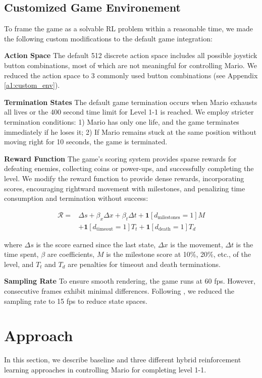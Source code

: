 \documentclass{article}
\begin{document}
\subsection{Customized Game Environement}

To frame the game as a solvable RL problem within a reasonable time, we made 
the following custom modifications to the default game integration:

\textbf{Action Space} 
The default 512 discrete action space includes all possible joystick button 
combinations, most of which are not meaningful for controlling Mario. We 
reduced the action space to 3 commonly used button combinations (see 
Appendix \ref{a1:custom_env}).

\textbf{Termination States}
The default game termination occurs when Mario exhausts all lives or the 400 
second time limit for Level 1-1 is reached. We employ stricter termination 
conditions: 1) Mario has only one life, and the game terminates immediately if 
he loses it; 2) If Mario remains stuck at the same position without moving 
right for 10 seconds, the game is terminated.

\textbf{Reward Function}
\label{sec:reward}
The game's scoring system provides sparse rewards for defeating enemies, 
collecting coins or power-ups, and successfully completing the level.
We modify the reward function to provide dense rewards, incorporating scores, 
encouraging rightward movement with milestones, and penalizing time consumption 
and termination without success:

\begin{align*}
      \mathcal{R} = &\Delta s + \beta_x \Delta x + \beta_t \Delta t + \mathbf{1}[d_{\text{milestones}} = 1] M\\
      & + \mathbf{1}[d_{\text{timeout}} = 1] T_t + \mathbf{1}[d_{\text{death}} = 1] T_d
\end{align*}

where $\Delta s$ is the score earned since the last state, $\Delta x$ is the 
movement, $\Delta t$ is the time spent, $\beta$ are coefficients, $M$ is the 
milestone score at 10\%, 20\%, etc., of the level, and $T_t$ and $T_d$ are 
penalties for timeout and death terminations.

\textbf{Sampling Rate}
To ensure smooth rendering, the game runs at 60 fps. However, consecutive 
frames exhibit minimal differences. Following \cite{feng2024mario}, 
we reduced the sampling rate to 15 fps to reduce state spaces.


\section{Approach}
In this section, we describe baseline and three different hybrid reinforcement 
learning approaches in controlling Mario for completing level 1-1.
\end{document}
